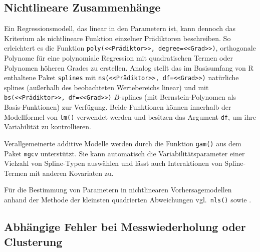 \subsection{Nichtlineare Zusammenhänge}
\label{sec:lmNonlin}

Ein Regressionsmodell, das linear in den Parametern ist, kann dennoch das Kriterium als nichtlineare Funktion einzelner Prädiktoren beschreiben. So erleichtert es die Funktion \lstinline!poly(<<Prädiktor>>, degree=<<Grad>>)!, orthogonale Polynome für eine polynomiale Regression mit quadratischen Termen oder Polynomen höheren Grades zu erstellen. Analog stellt das im Basisumfang von R enthaltene Paket \lstinline!splines! mit \lstinline!ns(<<Prädiktor>>, df=<<Grad>>)! natürliche splines (außerhalb des beobachteten Wertebereichs linear) und mit \lstinline!bs(<<Prädiktor>>, df=<<Grad>>)! $B$-splines (mit Bernstein-Polynomen als Basis-Funktionen) zur Verfügung. Beide Funktionen können innerhalb der Modellformel von \lstinline!lm()! verwendet werden und besitzen das Argument \lstinline!df!, um ihre Variabilität zu kontrollieren.

Verallgemeinerte additive Modelle werden durch die Funktion \lstinline!gam()! aus dem Paket \lstinline!mgcv! \cite{Wood2006} unterstützt. Sie kann automatisch die Variabilitätsparameter einer Vielzahl von Spline-Typen auswählen und lässt auch Interaktionen von Spline-Termen mit anderen Kovariaten zu.

Für die Bestimmung von Parametern in nichtlinearen Vorhersagemodellen anhand der Methode der kleinsten quadrierten Abweichungen vgl.\ \lstinline!nls()! sowie .

\subsection{Abhängige Fehler bei Messwiederholung oder Clusterung}
\label{sec:lmLongitudinal}

